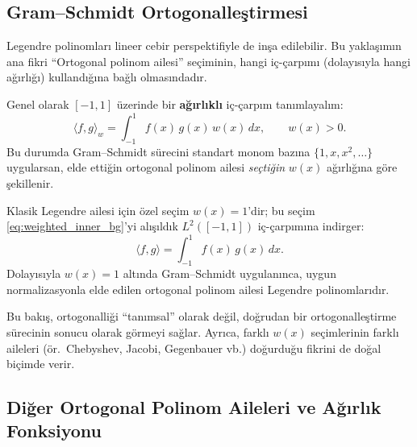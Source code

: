 \newpage
\subsection{Gram--Schmidt Ortogonalleştirmesi}

Legendre polinomları lineer cebir perspektifiyle de inşa edilebilir. Bu yaklaşımın ana fikri ``Ortogonal polinom ailesi'' seçiminin, hangi iç-çarpımı (dolayısıyla hangi ağırlığı) kullandığına bağlı olmasındadır.

Genel olarak $[-1,1]$ üzerinde bir \textbf{ağırlıklı} iç-çarpım tanımlayalım:
\begin{equation}
\langle f,g\rangle_w=\int_{-1}^{1} f(x)\,g(x)\,w(x)\,dx,
\qquad w(x)>0.
\label{eq:weighted_inner_bg}
\end{equation}
Bu durumda Gram--Schmidt sürecini standart monom bazına
$\{1,x,x^2,\ldots\}$ uygularsan, elde ettiğin ortogonal polinom ailesi
\emph{seçtiğin} $w(x)$ ağırlığına göre şekillenir.

Klasik Legendre ailesi için özel seçim $w(x)=1$'dir; bu seçim \eqref{eq:weighted_inner_bg}'yi
alışıldık $L^2([-1,1])$ iç-çarpımına indirger:
\begin{equation}
\langle f,g\rangle=\int_{-1}^{1} f(x)\,g(x)\,dx.
\label{eq:L2_inner_bg}
\end{equation}
Dolayısıyla $w(x)=1$ altında Gram--Schmidt uygulanınca,
uygun normalizasyonla elde edilen ortogonal polinom ailesi Legendre polinomlarıdır.

Bu bakış, ortogonalliği ``tanımsal'' olarak değil,
doğrudan bir ortogonalleştirme sürecinin sonucu olarak görmeyi sağlar.
Ayrıca, farklı $w(x)$ seçimlerinin farklı aileleri (ör.\ Chebyshev, Jacobi, Gegenbauer vb.)
doğurduğu fikrini de doğal biçimde verir.

\subsection{Diğer Ortogonal Polinom Aileleri ve Ağırlık Fonksiyonu}

